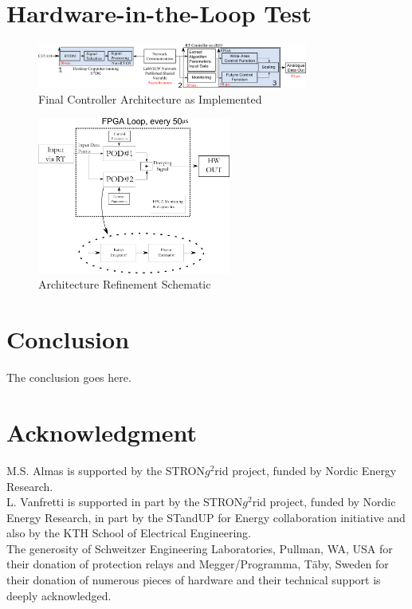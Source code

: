 \documentclass[conference]{IEEEtran}
\begin{document}
\section{Hardware-in-the-Loop Test}

\begin{figure}[!h]
\centering
\includegraphics[width=3.5in]{Final_RT_Arch.png} 
\caption{Final Controller Architecture as Implemented}
\label{Hardware_Outline}
\end{figure}

\begin{figure}[!ht]
\centering
\includegraphics[width=2.5in]{FPGAOnly.png} 
\caption{Architecture Refinement Schematic}
\label{FPGA_Blocks}
\end{figure}

\section{Conclusion}
The conclusion goes here.






\section*{Acknowledgment}


M.S. Almas is supported by the STRON$g^{2}$rid project, funded by Nordic Energy Research.\\
L. Vanfretti is supported in part by the STRON$g^{2}$rid project, funded by Nordic Energy Research, in part by the STandUP for Energy collaboration initiative and also by the KTH School of Electrical Engineering.\\
The generosity of Schweitzer Engineering Laboratories, Pullman, WA, USA for their donation of protection relays and Megger/Programma, T\"{a}by, Sweden for their donation of numerous pieces of hardware and their technical support is deeply acknowledged.
\end{document}
